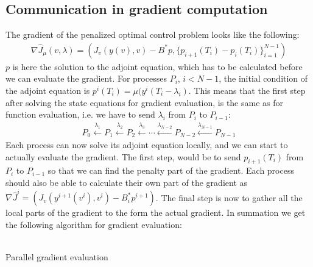 \subsection{Communication in gradient computation}
The gradient of the penalized optimal control problem looks like the following:
\begin{align*}
\nabla \hat J_{\mu}(v,\lambda) = (J_v(y(v),v)-B^*p,\{p_{i+1}(T_i) - p_{i}(T_i)\}_{i=1}^{N-1})
\end{align*}
$p$ is here the solution to the adjoint equation, which has to be calculated before we can evaluate the gradient. For processes $P_i$, $i<N-1$, the initial condition of the adjoint equation is $p^i(T_{i})=\mu(y^i(T_{i}-\lambda_{i})$. This means that the first step after solving the state equations for gradient evaluation, is the same as for function evaluation, i.e. we have to send $\lambda_i$ from $P_{i}$ to $P_{i-1}$:
\begin{align*}
P_0\overset{\lambda_1}{\longleftarrow}P_1\overset{\lambda_2}{\longleftarrow}P_2 \overset{\lambda_3}{\longleftarrow}\cdots \overset{\lambda_{N-2}}{\longleftarrow}P_{N-2}\overset{\lambda_{N-1}}{\longleftarrow}P_{N-1}
\end{align*}
Each process can now solve its adjoint equation locally, and we can start to actually evaluate the gradient. The first step, would be to send $p_{i+1}(T_{i})$ from $P_i$ to $P_{i-1}$ so that we can find the penalty part of the gradient. Each process should also be able to calculate their own part of the gradient as $\nabla \hat J^i=(J_v(y^{i+1}(v^i),v^i)-B^*_ip^{i+1})$. The final step is now to gather all the local parts of the gradient to the form the actual gradient. In summation we get the following algorithm for gradient evaluation:
\\
\\
\begin{algorithm}[H]
\caption{Parallel gradient evaluation}
\end{algorithm}

